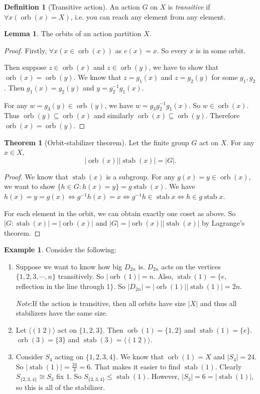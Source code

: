 \documentclass[a4paper]{article}
\theoremstyle{definition}
\newtheorem*{thm}{Theorem}
\newtheorem*{defi}{Definition}
\newtheorem*{eg}{Example}
\newtheorem*{lemma}{Lemma}
\newcommand{\note}{\noindent \emph{Note}:\;}
\newcommand{\bra}{\langle}
\newcommand{\ket}{\rangle}
\DeclareMathOperator\orb{orb}
\DeclareMathOperator\stab{stab}
\begin{document}
\begin{defi}[Transitive action]
  An action $G$ on $X$ is \emph{transitive} if $\forall x(\orb(x) = X)$, i.e. you can reach any element from any element.
\end{defi}

\begin{lemma}
  The orbits of an action partition $X$.
\end{lemma}

\begin{proof}
  Firstly, $\forall x(x\in \orb (x))$ as $e(x) = x$. So every $x$ is in some orbit.

  Then suppose $z\in \orb (x)$ and $z\in \orb (y)$, we have to show that $\orb(x) = \orb (y)$. We know that $z = g_1(x)$ and $z = g_2(y)$ for some $g_1, g_2$. Then $g_1(x) = g_2(y)$ and $y = g_2^{-1}g_1(x)$.

  For any $w = g_3(y)\in \orb (y)$, we have $w = g_3g_2^{-1}g_1(x)$. So $w\in \orb (x)$. Thus $\orb (y) \subseteq \orb (x)$ and similarly $\orb (x) \subseteq \orb (y)$. Therefore $\orb (x) = \orb (y)$.
\end{proof}

\begin{thm}[Orbit-stabilizer theorem]
  Let the finite group $G$ act on $X$. For any $x\in X$,
  \[
  |\orb(x)||\stab(x)| = |G|.
  \]
\end{thm}

\begin{proof}
  We know that $\stab(x)$ is a subgroup. For any $g(x) = y\in \orb(x)$, we want to show $\{h\in G: h(x) = y\} = g\stab (x)$. We have $h(x) = y = g(x) \Leftrightarrow g^{-1}h(x) = x \Leftrightarrow g^{-1}h\in \stab x \Leftrightarrow h\in g\stab x$.

  For each element in the orbit, we can obtain exactly one coset as above. So $|G: \stab (x)| = |\orb (x)|$ and $|G| = |\orb (x)||\stab(x)|$ by Lagrange's theorem.
\end{proof}

\begin{eg}
  Consider the following:
  \begin{enumerate}
  \item Suppose we want to know how big $D_{2n}$ is. $D_{2n}$ acts on the vertices $\{1, 2, 3, \cdots, n\}$ transitively. So $|\orb(1)| = n$. Also, $\stab(1) =\{e, $ reflection in the line through 1$\}$. So $|D_{2n}| = |\orb(1)||\stab(1)| = 2n$.

    \note If the action is transitive, then all orbits have size $|X|$ and thus all stabilizers have the same size.
  \item Let $\bra (1\; 2)\ket$ act on $\{1, 2, 3\}$. Then $\orb(1) = \{1, 2\}$ and $\stab(1) = \{e\}$. $\orb(3) = \{3\}$ and $\stab(3) = \bra(1\; 2)\ket$.
  \item Consider $S_4$ acting on $\{1, 2, 3, 4\}$. We know that $\orb(1) = X$ and $|S_4| = 24$. So $|\stab(1)| = \frac{24}{4} = 6$. That makes it easier to find $\stab(1)$. Clearly $S_{\{2, 3, 4\}} \cong S_3$ fix $1$. So $S_{\{2, 3, 4\}}\leq \stab(1)$. However, $|S_3| = 6 = |\stab(1)|$, so this is all of the stabilizer.
  \end{enumerate}
\end{eg}
\end{document}
